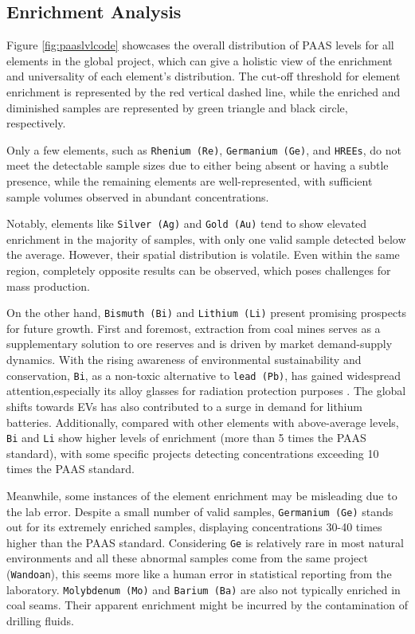 \documentclass[11pt,a4paper,]{article}
\begin{document}
\subsection{Enrichment Analysis}\label{enrichment-analysis-1}

Figure \ref{fig:paaslvlcode} showcases the overall distribution of PAAS levels for all elements in the global project, which can give a holistic view of the enrichment and universality of each element's distribution. The cut-off threshold for element enrichment is represented by the red vertical dashed line, while the enriched and diminished samples are represented by green triangle and black circle, respectively.

Only a few elements, such as \texttt{Rhenium\ (Re)}, \texttt{Germanium\ (Ge)}, and \texttt{HREEs}, do not meet the detectable sample sizes due to either being absent or having a subtle presence, while the remaining elements are well-represented, with sufficient sample volumes observed in abundant concentrations.

Notably, elements like \texttt{Silver\ (Ag)} and \texttt{Gold\ (Au)} tend to show elevated enrichment in the majority of samples, with only one valid sample detected below the average. However, their spatial distribution is volatile. Even within the same region, completely opposite results can be observed, which poses challenges for mass production.

On the other hand, \texttt{Bismuth\ (Bi)} and \texttt{Lithium\ (Li)} present promising prospects for future growth. First and foremost, extraction from coal mines serves as a supplementary solution to ore reserves and is driven by market demand-supply dynamics. With the rising awareness of environmental sustainability and conservation, \texttt{Bi}, as a non-toxic alternative to \texttt{lead\ (Pb)}, has gained widespread attention,especially its alloy glasses for radiation protection purposes \autocite{Buriahi2021}. The global shifts towards EVs has also contributed to a surge in demand for lithium batteries. Additionally, compared with other elements with above-average levels, \texttt{Bi} and \texttt{Li} show higher levels of enrichment (more than 5 times the PAAS standard), with some specific projects detecting concentrations exceeding 10 times the PAAS standard.

Meanwhile, some instances of the element enrichment may be misleading due to the lab error. Despite a small number of valid samples, \texttt{Germanium\ (Ge)} stands out for its extremely enriched samples, displaying concentrations 30-40 times higher than the PAAS standard. Considering \texttt{Ge} is relatively rare in most natural environments and all these abnormal samples come from the same project (\texttt{Wandoan}), this seems more like a human error in statistical reporting from the laboratory. \texttt{Molybdenum\ (Mo)} and \texttt{Barium\ (Ba)} are also not typically enriched in coal seams. Their apparent enrichment might be incurred by the contamination of drilling fluids.
\end{document}
